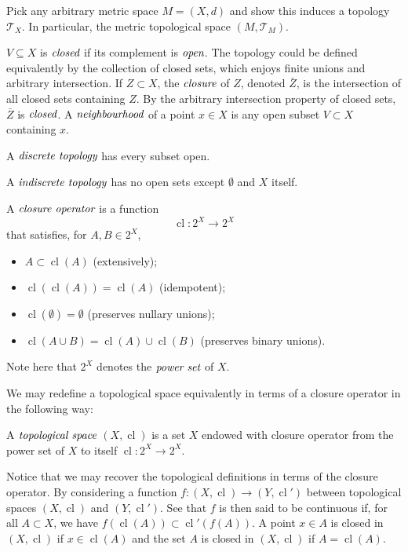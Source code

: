 \begin{prob}
	Pick any arbitrary metric space $M=(X,d)$ and show this
	induces a topology $\mathcal{T}_{X}$. In particular,
	the metric topological space $(M, \mathcal{T}_{M})$.
\end{prob}

$V \subseteq X$ is $\emph{closed}$ if its complement is $\emph{open}$.
The topology could be defined equivalently by the collection of closed
sets, which enjoys finite unions and arbitrary intersection.
If $Z \subset X$, the $\emph{closure}$ of $Z$, denoted $\bar{Z}$, is
the intersection of all closed sets containing $Z$. By the arbitrary
intersection property of closed sets, $\bar{Z}$ is $\emph{closed}$.
A $\emph{neighbourhood}$ of a point $x \in X$ is any open subset $V \subset X$
containing $x$.

\begin{defn}
	A $\emph{discrete topology}$ has every subset open.
\end{defn}

\begin{defn}
	A $\emph{indiscrete topology}$ has no open sets except $\emptyset$ and $X$ itself.
\end{defn}

\begin{defn}
	A $\emph{closure operator}$ is a function
	\[
		\operatorname{cl}: 2^{X} \to 2^{X}
	\]
	that satisfies, for $A,B \in 2^{X}$,
	\begin{itemize}
		\item $A \subset \operatorname{cl}(A)$ (extensively);
		\item $\operatorname{cl}(\operatorname{cl}(A)) = \operatorname{cl}(A)$ (idempotent);
		\item $\operatorname{cl}(\emptyset)=\emptyset$ (preserves nullary unions);
		\item $\operatorname{cl}(A \cup B) = \operatorname{cl}(A) \cup \operatorname{cl}(B)$
			(preserves binary unions).
	\end{itemize}
	Note here that $2^{X}$ denotes the $\emph{power set}$ of $X$.
\end{defn}

We may redefine a topological space equivalently in terms of a closure operator
in the following way:

\begin{defn}
	A $\emph{topological space}$ $(X, \operatorname{cl})$ is a set $X$
	endowed with closure operator from the power set of $X$ to itself
	$\operatorname{cl}: 2^{X} \to 2^{X}$.
\end{defn}

Notice that we may recover the topological definitions in terms of the
closure operator.
By considering a function $f: (X, \operatorname{cl}) \to (Y, \operatorname{cl}')$
between topological spaces $(X, \operatorname{cl})$ and $(Y, \operatorname{cl}')$.
See that $f$ is then said to be continuous if, for all $A \subset X$, we have
$f(\operatorname{cl}(A)) \subset \operatorname{cl}'(f(A))$. A point
$x \in A$ is closed in $(X,\operatorname{cl})$ if $x \in \operatorname{cl}(A)$
and the set $A$ is closed in $(X, \operatorname{cl})$ if $A=\operatorname{cl}(A)$.
